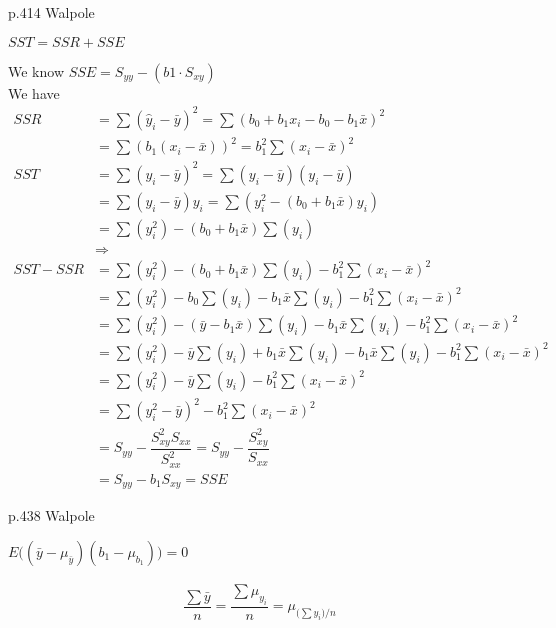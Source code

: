 \newpage
p.414 Walpole\\[2ex]
\begin{center}
    $SST = SSR + SSE$
\end{center}
We know $SSE = S_{yy} - (b1 \cdot S_{xy})$\\[1ex]
We have 
\begin{align*}
    SSR &= \sum(\hat{y}_{i} - \bar{y})^{2} = \sum(b_{0} + b_{1}x_{i} - b_{0} - b_{1}\bar{x})^{2}\\
    &= \sum(b_{1}(x_{i} - \bar{x}))^{2} = b_{1}^{2}\sum(x_{i} - \bar{x})^{2}\\[2ex]
    SST &= \sum(y_{i} - \bar{y})^{2} = \sum(y_{i} - \bar{y})(y_{i} - \bar{y})\\
    &= \sum(y_{i} - \bar{y})y_{i} = \sum(y_{i}^{2} - (b_{0} + b_{1}\bar{x})y_{i})\\
    &= \sum(y_{i}^{2}) - (b_{0} + b_{1}\bar{x})\sum(y_{i})\\[2ex]
    &\Longrightarrow \\[2ex]
    SST - SSR &= \sum(y_{i}^{2}) - (b_{0} + b_{1}\bar{x})\sum(y_{i}) - b_{1}^{2}\sum(x_{i} - \bar{x})^{2}\\
    &= \sum(y_{i}^{2}) - b_{0}\sum(y_{i}) - b_{1}\bar{x}\sum(y_{i}) - b_{1}^{2}\sum(x_{i} - \bar{x})^{2}\\
    &= \sum(y_{i}^{2}) - (\bar{y} - b_{1}\bar{x})\sum(y_{i}) - b_{1}\bar{x}\sum(y_{i}) - b_{1}^{2}\sum(x_{i} - \bar{x})^{2}\\
    &= \sum(y_{i}^{2}) - \bar{y}\sum(y_{i}) + b_{1}\bar{x}\sum(y_{i}) - b_{1}\bar{x}\sum(y_{i}) - b_{1}^{2}\sum(x_{i} - \bar{x})^{2}\\
    &= \sum(y_{i}^{2}) - \bar{y}\sum(y_{i}) - b_{1}^{2}\sum(x_{i} - \bar{x})^{2}\\
    &= \sum(y_{i}^{2} - \bar{y})^{2} - b_{1}^{2}\sum(x_{i} - \bar{x})^{2}\\
    &= S_{yy} - \dfrac{S_{xy}^{2}S_{xx}}{S_{xx}^{2}} = S_{yy} - \dfrac{S_{xy}^{2}}{S_{xx}} \\
    &= S_{yy} - b_{1}S_{xy} = SSE
\end{align*}

\newpage
p.438 Walpole
\begin{center}
    $E\Big((\bar{y} - \mu_{\bar{y}})(b_{1} - \mu_{b_{1}})\Big) = 0$
\end{center}

\begin{align*}
    \dfrac{\sum \bar{y}}{n} = \dfrac{\sum \mu_{y_{i}}}{n} = \mu_{\Big(\sum y_{i}\Big)/n}
\end{align*}

